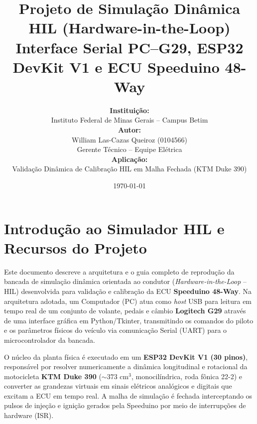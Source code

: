 \documentclass[12pt,a4paper]{article}
\title{Projeto de Simulação Dinâmica HIL (Hardware-in-the-Loop) \\ \large Interface Serial PC--G29, ESP32 DevKit V1 e ECU Speeduino 48-Way}
\author{
    \textbf{Instituição:} \\
    Instituto Federal de Minas Gerais -- Campus Betim \\[0.8em]
    \textbf{Autor:} \\
    William Las-Cazas Queiroz (0104566) \\
    Gerente Técnico -- Equipe Elétrica \\[0.8em]
    \textbf{Aplicação:} \\
    Validação Dinâmica de Calibração HIL em Malha Fechada (KTM Duke 390)
}
\date{\today}
\begin{document}
\maketitle
\thispagestyle{empty}
\newpage

\tableofcontents
\newpage

\section{Introdução ao Simulador HIL e Recursos do Projeto}

Este documento descreve a arquitetura e o guia completo de reprodução da bancada de simulação dinâmica orientada ao condutor (\textit{Hardware-in-the-Loop} -- HIL) desenvolvida para validação e calibração da ECU \textbf{Speeduino 48-Way}. Na arquitetura adotada, um Computador (PC) atua como \textit{host} USB para leitura em tempo real de um conjunto de volante, pedais e câmbio \textbf{Logitech G29} através de uma interface gráfica em Python/Tkinter, transmitindo os comandos do piloto e os parâmetros físicos do veículo via comunicação Serial (UART) para o microcontrolador da bancada.

O núcleo da planta física é executado em um \textbf{ESP32 DevKit V1 (30 pinos)}, responsável por resolver numericamente a dinâmica longitudinal e rotacional da motocicleta \textbf{KTM Duke 390} ($\sim 373\text{ cm}^3$, monocilíndrica, roda fônica 22-2) e converter as grandezas virtuais em sinais elétricos analógicos e digitais que excitam a ECU em tempo real. A malha de simulação é fechada interceptando os pulsos de injeção e ignição gerados pela Speeduino por meio de interrupções de hardware (ISR).
\end{document}
